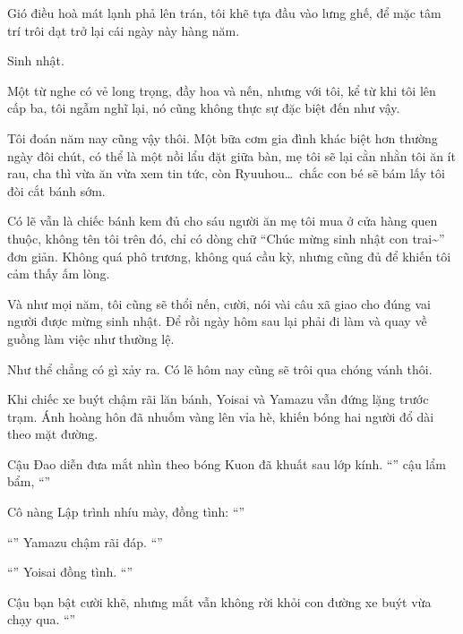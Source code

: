\documentclass[../main.tex]{subfiles}
\begin{document}
Gió điều hoà mát lạnh phả lên trán, tôi khẽ tựa đầu vào lưng ghế, để mặc tâm trí trôi dạt trở lại cái ngày này hàng năm.

Sinh nhật.

Một từ nghe có vẻ long trọng, đầy hoa và nến, nhưng với tôi, kể từ khi tôi lên cấp ba, tôi ngẫm nghĩ lại, nó cũng không thực sự đặc biệt đến như vậy.

Tôi đoán năm nay cũng vậy thôi. Một bữa cơm gia đình khác biệt hơn thường ngày đôi chút, có thể là một nồi lẩu đặt giữa bàn, mẹ tôi sẽ lại cằn nhằn tôi ăn ít rau, cha thì vừa ăn vừa xem tin tức, còn Ryuuhou\dots\ chắc con bé sẽ bám lấy tôi đòi cắt bánh sớm.

Có lẽ vẫn là chiếc bánh kem đủ cho sáu người ăn mẹ tôi mua ở cửa hàng quen thuộc, không tên tôi trên đó, chỉ có dòng chữ ``Chúc mừng sinh nhật con trai\~{}'' đơn giản. Không quá phô trương, không quá cầu kỳ, nhưng cũng đủ để khiến tôi cảm thấy ấm lòng.

Và như mọi năm, tôi cũng sẽ thổi nến, cười, nói vài câu xã giao cho đúng vai người được mừng sinh nhật. Để rồi ngày hôm sau lại phải đi làm và quay về guồng làm việc như thường lệ.

Như thể chẳng có gì xảy ra. Có lẽ hôm nay cũng sẽ trôi qua chóng vánh thôi.

\pov{-}

Khi chiếc xe buýt chậm rãi lăn bánh, Yoisai và Yamazu vẫn đứng lặng trước trạm. Ánh hoàng hôn đã nhuốm vàng lên vỉa hè, khiến bóng hai người đổ dài theo mặt đường.

Cậu Đao diễn đưa mắt nhìn theo bóng Kuon đã khuất sau lớp kính. ``'' cậu lẩm bẩm, ``''

Cô nàng Lập trình nhíu mày, đồng tình: ``''

``'' Yamazu chậm rãi đáp. ``''

``'' Yoisai đồng tình. ``''

Cậu bạn bật cười khẽ, nhưng mắt vẫn không rời khỏi con đường xe buýt vừa chạy qua. ``''
\end{document}

